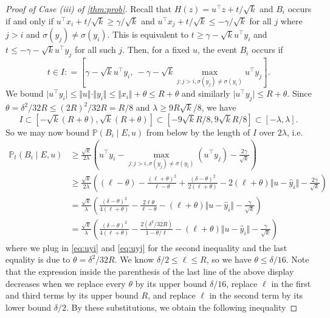 \documentclass[aoap]{imsart}
\numberwithin{equation}{section}
\theoremstyle{definition}
\theoremstyle{remark}
\renewcommand{\hat}{\widehat}
\numberwithin{equation}{section}
\newcommand{\0}{\mathbf{0}}
\newcommand{\1}{\mathbf{1}}
\renewcommand{\P}{\mathbb{P}}
\numberwithin{equation}{section}
\begin{document}
\begin{proof}[Proof of Case (iii) of \cref{thm:prob}]
Recall that $H(z)=u^{\intercal}z+t/\sqrt{k}$ and $B_i$ occurs if and only if $u^{\intercal}x_i+t/\sqrt{k}\geq \gamma/\sqrt{k}$ and $u^{\intercal}x_j+t/\sqrt{k}\leq-\gamma/\sqrt{k}$ for all $j$ where $j>i$ and $\sigma (y_j)\neq\sigma (y_i)$. This is equivalent to $t\geq \gamma-\sqrt{k}u^{\intercal}y_i$ and $t\leq -\gamma-\sqrt{k}u^{\intercal}y_j$ for all such $j$. Then, for a fixed $u$, the event $B_i$ occurs if
\[ t\in I : = \left[\gamma - \sqrt{k}u^{\intercal}y_i, \  -\gamma -\sqrt{k}\max_{j:j>i, \sigma(y_j)\neq\sigma(y_i)}u^{\intercal}y_j\right]. \]
We bound $\vert u^{\intercal}y_i\vert \leq \Vert u\Vert \cdot\Vert y_i\Vert \leq  \Vert x_i\Vert +\theta \leq R+\theta$ and similarly $\vert u^{\intercal}y_{j}\vert \leq R+\theta$.
Since $\theta = \delta^2/32R\leq (2R)^2/32R= R/8$ and $\lambda\geq 9R\sqrt{k}/8$, we have
\[ I\subset [-\sqrt{k}(R+\theta), \sqrt{k}(R+\theta)]\subset [-9\sqrt{k}R/8, 9\sqrt{k}R/8]\subset [-\lambda, \lambda].\]
So we may now bound $\P(B_i\mid E, u)$ from below by the length of $I$ over $2\lambda$, i.e.
\begin{align*}
\P_{t}\left(B_{i}\mid E, u\right) & \geq \frac{\sqrt{k}}{2\lambda}\left(u^{\intercal}y_{i}-\max_{j:j>i, \sigma(y_j)\neq \sigma(y_i)}( u^{\intercal}y_{j}) -\frac{2\gamma}{\sqrt{k}}\right)
\\ & \geq \frac{\sqrt{k}}{2\lambda}\left((\ell-\theta) -\frac{(\ell+\theta)^2}{\ell-\theta} + \frac{(\delta -\theta)^2}{2(\ell+\theta)} - 2 (\ell+\theta)\Vert u-\hat{y}_{i}\Vert - \frac{2\gamma}{\sqrt{k}}\right)  
\\ & = \frac{\sqrt{k}}{\lambda}\left(\frac{(\delta -\theta)^2}{4(\ell+\theta)} -\frac{2\ell\theta}{\ell-\theta}  - (\ell+\theta)\Vert u-\hat{y}_{i}\Vert - \frac{\gamma}{\sqrt{k}}\right) 
\\ & = \frac{\sqrt{k}}{\lambda}\left(\frac{(\delta -\theta)^2}{4(\ell+\theta)} -\frac{2 (\delta^2/32R)}{1-\theta/\ell}  - (\ell+\theta)\Vert u-\hat{y}_{i}\Vert - \frac{\gamma}{\sqrt{k}}\right) 
\end{align*}
where we plug in \eqref{eq:uyi} and \eqref{eq:uyj} for the second inequality and the last equality is due to $\theta = \delta^2/32R$. We know $\delta /2 \leq \ell \leq R$, so we have  $\theta \leq \delta/16 $. Note that the expression inside the parenthesis of the last line of the above display  decreases when we replace every $\theta$ by its upper bound $\delta/16$, replace $\ell$ in the first and third terms by its upper bound $R$, and replace $\ell$ in the second term by its lower bound $\delta/2$. By these substitutions, we obtain the following inequality

\end{proof}
\end{document}
